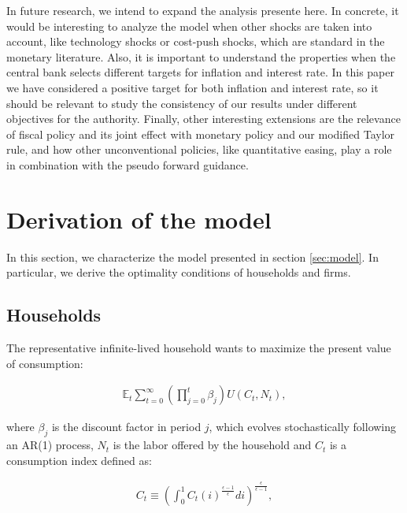 \documentclass[11pt]{article}
\numberwithin{equation}{section}
\begin{document}
In future research, we intend to expand the analysis presente here. In concrete, it would be interesting to analyze the model when other shocks are taken into account, like technology shocks or cost-push shocks, which are standard in the monetary literature. Also, it is important to understand the properties when the central bank selects different targets for inflation and interest rate. In this paper we have considered a positive target for both inflation and interest rate, so it should be relevant to study the consistency of our results under different objectives for the authority. Finally, other interesting extensions are the relevance of fiscal policy and its joint effect with monetary policy and our modified Taylor rule, and how other unconventional policies, like quantitative easing, play a role in combination with the pseudo forward guidance.




\newpage\appendix

\section{Derivation of the model}\label{app:derivation}

In this section, we characterize the model presented in section \ref{sec:model}. In particular, we derive the optimality conditions of households and firms.

\subsection{Households}

The representative infinite-lived household wants to maximize the present value of consumption:

\begin{align*}
\mathbb{E}_t\sum_{t=0}^{\infty}\left(\prod_{j=0}^t\beta_j\right)U(C_t,N_t),
\end{align*}

\noindent where $\beta_j$ is the discount factor in period $j$, which evolves stochastically following an AR(1) process, $N_t$ is the labor offered by the household and $C_t$ is a consumption index defined as:

\begin{align*}
C_t\equiv\left(\int_0^1C_t(i)^{\frac{\epsilon-1}{\epsilon}}di\right)^{\frac{\epsilon}{\epsilon-1}},
\end{align*}
\end{document}
